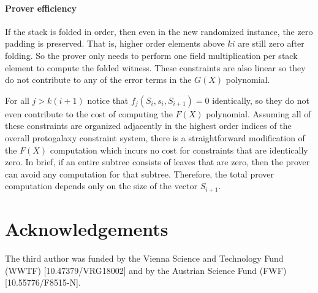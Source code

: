 \documentclass[11pt]{article} %
\newcommand{\plonk}{\ensuremath{\mathcal{P} \mathfrak{lon}\mathcal{K}}\xspace}
\newcommand{\F}{\ensuremath{\mathbb F}\xspace}
\begin{document}
%
%
\paragraph{Prover efficiency}
If the stack is folded in order, then even in the new randomized instance, the zero padding is preserved.
That is, higher order elements above $ ki$ are still zero after folding.
So the prover only needs to perform one field multiplication per stack element to compute the folded witness.
These constraints are also linear so they do not contribute to any of the error terms in the $G(X)$ polynomial.

For all $j > k (i+1)$ notice that $f_j(S_i, s_i, S_{i+1}) = 0$ identically, so they do not even contribute to the cost of computing the $F(X)$ polynomial.
Assuming all of these constraints are organized adjacently in the highest order indices of the overall protogalaxy constraint system, there is a straightforward modification of the $F(X)$ computation which incurs no cost for constraints that are identically zero.
In brief, if an entire subtree consists of leaves that are zero, then the prover can avoid any computation for that subtree.
Therefore, the total prover computation depends only on the size of the vector $S_{i+1}$.




\section*{Acknowledgements}
The third author was funded by the Vienna Science and Technology Fund (WWTF) [10.47379/VRG18002] and by the Austrian Science Fund (FWF) [10.55776/F8515-N].



\end{document}
